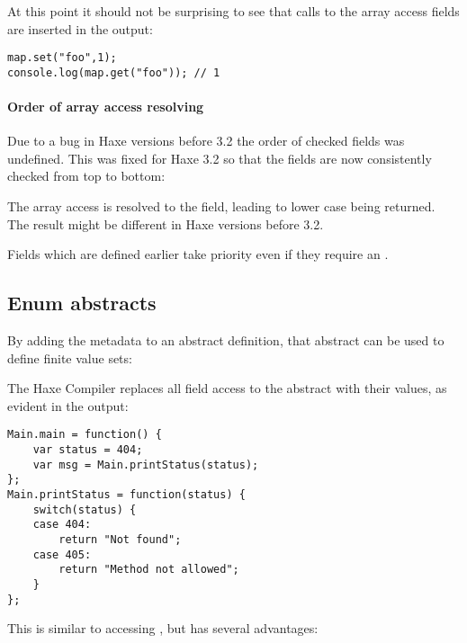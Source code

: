 
At this point it should not be surprising to see that calls to the array access fields are inserted in the output:

\begin{lstlisting}
map.set("foo",1);
console.log(map.get("foo")); // 1
\end{lstlisting}

\paragraph{Order of array access resolving}
\label{types-abstract-array-access-order}

Due to a bug in Haxe versions before 3.2 the order of checked  fields was undefined. This was fixed for Haxe 3.2 so that the fields are now consistently checked from top to bottom:


The array access  is resolved to the  field, leading to lower case  being returned. The result might be different in Haxe versions before 3.2.

Fields which are defined earlier take priority even if they require an .



\subsection{Enum abstracts}
\label{types-abstract-enum}

By adding the  metadata to an abstract definition, that abstract can be used to define finite value sets:


The Haxe Compiler replaces all field access to the  abstract with their values, as evident in the  output:

\begin{lstlisting}
Main.main = function() {
	var status = 404;
	var msg = Main.printStatus(status);
};
Main.printStatus = function(status) {
	switch(status) {
	case 404:
		return "Not found";
	case 405:
		return "Method not allowed";
	}
};
\end{lstlisting}

This is similar to accessing , but has several advantages:

